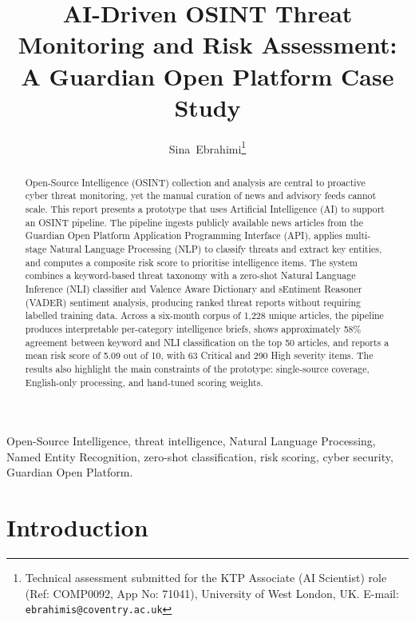 \documentclass[12pt,lettersize,journal,onecolumn]{IEEEtran}
\begin{document}
\title{AI-Driven OSINT Threat Monitoring and Risk Assessment: A Guardian Open Platform Case Study}

\author{Sina~Ebrahimi\thanks{Technical assessment submitted for the KTP Associate (AI Scientist) role (Ref: COMP0092, App No: 71041), University of West London, UK\@. E-mail: \texttt{ebrahimis@coventry.ac.uk}}}


\maketitle
\vspace{-2.0\baselineskip}

% 
\begin{abstract}
Open-Source Intelligence (OSINT) collection and analysis are central to proactive cyber threat monitoring, yet the manual curation of news and advisory feeds cannot scale. This report presents a prototype that uses Artificial Intelligence (AI) to support an OSINT pipeline. The pipeline ingests publicly available news articles from the Guardian Open Platform Application Programming Interface (API), applies multi-stage Natural Language Processing (NLP) to classify threats and extract key entities, and computes a composite risk score to prioritise intelligence items. The system combines a keyword-based threat taxonomy with a zero-shot Natural Language Inference (NLI) classifier and Valence Aware Dictionary and sEntiment Reasoner (VADER) sentiment analysis, producing ranked threat reports without requiring labelled training data. Across a six-month corpus of 1,228 unique articles, the pipeline produces interpretable per-category intelligence briefs, shows approximately 58\% agreement between keyword and NLI classification on the top 50 articles, and reports a mean risk score of 5.09 out of 10, with 63 Critical and 290 High severity items. The results also highlight the main constraints of the prototype: single-source coverage, English-only processing, and hand-tuned scoring weights.
\end{abstract}

\begin{IEEEkeywords}
Open-Source Intelligence, threat intelligence, Natural Language Processing, Named Entity Recognition, zero-shot classification, risk scoring, cyber security, Guardian Open Platform.
\end{IEEEkeywords}

% 
\section{Introduction}
\label{sec:intro}
% 
\end{document}

